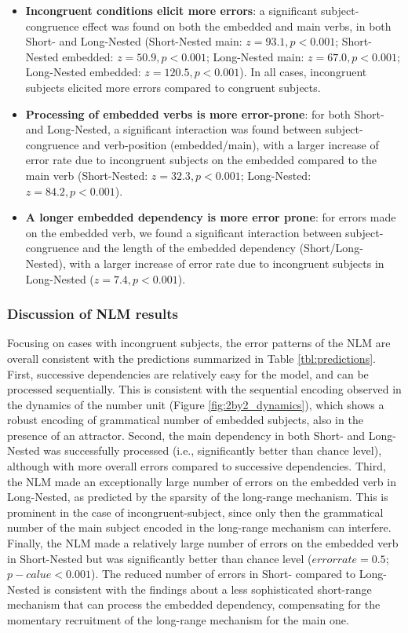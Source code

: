 \begin{itemize}
    \item \textbf{Incongruent conditions elicit more errors}: a significant subject-congruence effect was found on both the embedded and main verbs, in both Short- and Long-Nested (Short-Nested main: $z=93.1, p<0.001$; Short-Nested embedded: $z=50.9, p<0.001$; Long-Nested main: $z=67.0, p<0.001$; Long-Nested embedded: $z=120.5, p<0.001$). In all cases, incongruent subjects elicited more errors compared to congruent subjects.
    \item \textbf{Processing of embedded verbs is more error-prone}: for both Short- and Long-Nested, a significant interaction was found between subject-congruence and verb-position (embedded/main), with a larger increase of error rate due to incongruent subjects on the embedded compared to the main verb (Short-Nested: $z=32.3, p<0.001$; Long-Nested: $z=84.2, p<0.001$).
    \item \textbf{A longer embedded dependency is more error prone}: for errors made on the embedded verb, we found a significant interaction between subject-congruence and the length of the embedded dependency (Short/Long-Nested), with a larger increase of error rate due to incongruent subjects in Long-Nested ($z=7.4, p<0.001$).
\end{itemize}
 
\vspace{10pt}

\subsubsection{Discussion of NLM results}
Focusing on cases with incongruent subjects, the error patterns of the NLM are overall consistent with the predictions summarized in Table \ref{tbl:predictions}. First, successive dependencies are relatively easy for the model, and can be processed sequentially. This is consistent with the sequential encoding observed in the dynamics of the number unit (Figure \ref{fig:2by2_dynamics}), which shows a robust encoding of grammatical number of embedded subjects, also in the presence of an attractor. Second, the main dependency in both Short- and Long-Nested was successfully processed (i.e., significantly better than chance level), although with more overall errors compared to successive dependencies. Third, the NLM made an exceptionally large number of errors on the embedded verb in Long-Nested, as predicted by the sparsity of the long-range mechanism. This is prominent in the case of incongruent-subject, since only then the grammatical number of the main subject encoded in the long-range mechanism can interfere. Finally, the NLM made a relatively large number of errors on the embedded verb in Short-Nested but was significantly better than chance level ($error rate = 0.5$; $p-calue < 0.001$). The reduced number of errors in Short- compared to Long-Nested is consistent with the findings about a less sophisticated short-range mechanism that can process the embedded dependency, compensating for the momentary recruitment of the long-range mechanism for the main one. 


